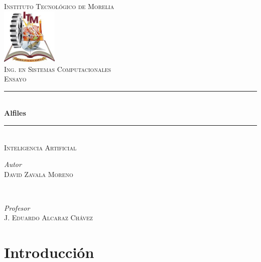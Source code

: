 \documentclass[12pt]{article}
\begin{document}
\begin{titlepage}
	\newcommand{\HRule}{\rule{\linewidth}{0.5mm}} 
	
	\center 
	
	
	
	\textsc{\LARGE Instituto Tecnológico de Morelia }\\[1.5cm] 
    
    \includegraphics[width=0.2\textwidth]{descarga.jpg}\\[1cm] 
	
	\textsc{\Large Ing. en Sistemas Computacionales}\\[0.5cm] 
	
	\textsc{\large Ensayo }\\[0.5cm] 
	
	
	
	\HRule\\[0.4cm]
	
	{\huge\bfseries Alfiles}\\[0.4cm]
	
	\HRule\\[0.6cm]
	
	\textsc{\large Inteligencia Artificial }\\[0.5cm]
	
	\begin{minipage}{0.4\textwidth}
		\begin{flushleft}
			\large
			\textit{Autor}\\
		    \textsc{David Zavala Moreno} 
		\end{flushleft}
	\end{minipage}
	~
	\begin{minipage}{0.5\textwidth}
		\begin{flushright}
			\large
			\textit{Profesor}\\
			\textsc{J. Eduardo Alcaraz Chávez}
		\end{flushright}
	\end{minipage}
  
\end{titlepage}

\newpage
\newpage
\tableofcontents 
\newpage

\section{Introducción}
\end{document}
